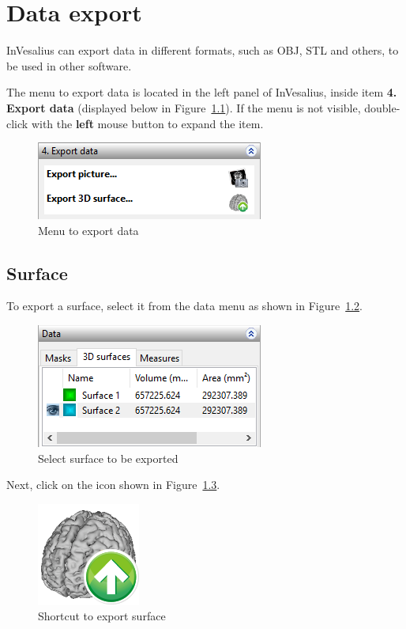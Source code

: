 \chapter{Data export}

InVesalius can export data in different formats, such as OBJ, STL and others, to be used in other software.

The menu to export data is located in the left panel of InVesalius, inside item \textbf{4. Export data} (displayed below in Figure~\ref{fig:data_export}). If the menu is not visible, double-click with the \textbf{left} mouse button to expand the item.

\begin{figure}[!htb]
\centering
\includegraphics[scale=0.8]{../user_guide_figures/invesalius_screen/painel_data_export_en.png}
\caption{Menu to export data}
\label{fig:data_export}
\end{figure}

\section{Surface}

To export a surface, select it from the data menu as shown in Figure~\ref{fig:data_export_selection}.

\newpage

\begin{figure}[!htb]
\centering
\includegraphics[scale=0.7]{../user_guide_figures/invesalius_screen/painel_data_export_selection_en.png}
\caption{Select surface to be exported}
\label{fig:data_export_selection}
\end{figure}

Next, click on the icon shown in Figure~\ref{fig:surface_export_original}.

\begin{figure}[!htb]
\centering
\includegraphics[scale=0.2]{../user_guide_figures/icons/surface_export_original.png}
\caption{Shortcut to export surface}
\label{fig:surface_export_original}
\end{figure}

